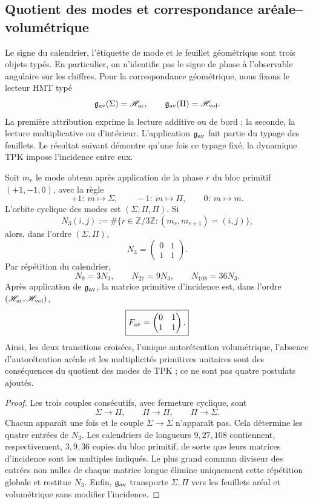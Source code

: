 \subsection{Quotient des modes et correspondance aréale--volumétrique}
\label{p12-83-c16-s2:sec:cociente-modos-fav}

Le signe du calendrier, l'étiquette de mode et le feuillet géométrique sont trois
objets typés. En particulier, on n'identifie pas le signe de phase à
l'observable angulaire sur les chiffres. Pour la correspondance géométrique, nous fixons le
lecteur HMT typé
\[
 \mathfrak g_{\rm av}(\Sigma)=\mathscr H_{\rm ar},
 \qquad
 \mathfrak g_{\rm av}(\Pi)=\mathscr H_{\rm vol}.
\]
La première attribution exprime la lecture additive ou de bord ; la seconde, la
lecture multiplicative ou d'intérieur. L'application \(\mathfrak g_{\rm av}\) fait
partie du typage des feuillets. Le résultat suivant démontre qu'une fois
ce typage fixé, la dynamique TPK impose l'incidence entre eux.

\begin{theorem}
\label{p12-83-c16-s2:thm:descenso-necesario-fav}
Soit \(m_r\) le mode obtenu après application de la phase \(r\) du bloc
primitif \((+1,-1,0)\), avec la règle
\[
 +1:\ m\mapsto\Sigma,\qquad
 -1:\ m\mapsto\Pi,\qquad
 0:\ m\mapsto m.
\]
L'orbite cyclique des modes est \((\Sigma,\Pi,\Pi)\). Si
\[
 N_3(i,j)
 :=
 \#\{r\in\mathbb Z/3\mathbb Z:(m_r,m_{r+1})=(i,j)\},
\]
alors, dans l'ordre \((\Sigma,\Pi)\),
\[
 \boxed{
 N_3=
 \begin{pmatrix}0&1\\1&1\end{pmatrix}.}
\]
Par répétition du calendrier,
\[
 N_9=3N_3,\qquad N_{27}=9N_3,\qquad N_{108}=36N_3.
\]
Après application de \(\mathfrak g_{\rm av}\), la matrice primitive
d'incidence est, dans l'ordre
\((\mathscr H_{\rm ar},\mathscr H_{\rm vol})\),
\[
 \boxed{
 F_{\rm av}=
 \begin{pmatrix}0&1\\1&1\end{pmatrix}.}
\]
Ainsi, les deux transitions croisées, l'unique autorétention volumétrique,
l'absence d'autorétention aréale et les multiplicités primitives unitaires
sont des conséquences du quotient des modes de TPK ; ce ne sont pas quatre postulats
ajoutés.
\end{theorem}

\begin{proof}
Les trois couples consécutifs, avec fermeture cyclique, sont
\[
 \Sigma\longrightarrow\Pi,\qquad
 \Pi\longrightarrow\Pi,\qquad
 \Pi\longrightarrow\Sigma.
\]
Chacun apparaît une fois et le couple
\(\Sigma\to\Sigma\) n'apparaît pas. Cela détermine les quatre entrées de
\(N_3\). Les calendriers de longueurs \(9,27,108\) contiennent,
respectivement, \(3,9,36\) copies du bloc primitif, de sorte que leurs
matrices d'incidence sont les multiples indiqués. Le plus grand commun diviseur
des entrées non nulles de chaque matrice longue élimine uniquement cette
répétition globale et restitue \(N_3\). Enfin,
\(\mathfrak g_{\rm av}\) transporte \(\Sigma,\Pi\) vers les feuillets aréal et
volumétrique sans modifier l'incidence.
\end{proof}

